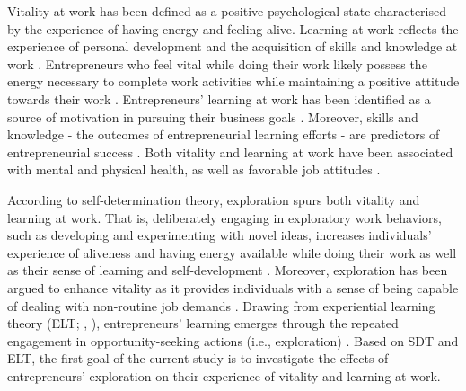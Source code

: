 \documentclass[man, 12pt, a4paper, noextraspace]{apa6}
\begin{document}
Vitality at work has been defined as a positive psychological state characterised by the experience of having energy and feeling alive. 
Learning at work reflects the experience of personal development and the acquisition of skills and knowledge at work \parencite{Spreitzer.2005b}. 
Entrepreneurs who feel vital while doing their work likely possess the energy necessary to complete work activities while maintaining a positive attitude towards their work \parencite{Ryan.1997}. 
Entrepreneurs' learning at work has been identified as a source of motivation in pursuing their business goals \parencite{Jayawarna2013}. 
Moreover, skills and knowledge - the outcomes of entrepreneurial learning efforts - are predictors of entrepreneurial success \parencite{Unger.2011}. 
Both vitality and learning at work have been associated with mental and physical health, as well as favorable job attitudes \parencite{Kleine.2019}. \par 

According to self-determination \parencite[SDT;][]{Ryan2001} theory, exploration spurs both vitality and learning at work. 
That is, deliberately engaging in exploratory work behaviors, such as developing and experimenting with novel ideas, increases individuals' experience of aliveness and having energy available while doing their work as well as their sense of learning and self-development \parencite{Spreitzer.2005b}. 
Moreover, exploration has been argued to enhance vitality as it provides individuals with a sense of being capable of dealing with non-routine job demands \parencite{Daniels2009, Niessen.2012}. 
Drawing from experiential learning theory (ELT; \citeauthor{Kolb2009}, \citeyear{Kolb2009}), entrepreneurs' learning emerges through the repeated engagement in opportunity-seeking actions (i.e., exploration) \parencite{Holcomb2009}. 
Based on SDT and ELT, the first goal of the current study is to investigate the effects of entrepreneurs' exploration on their experience of vitality and learning at work. \par
\end{document}

